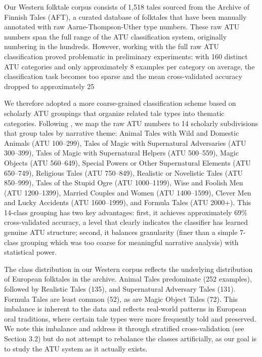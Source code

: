 \documentclass{article}
\begin{document}
Our Western folktale corpus consists of 1,518 tales sourced from the Archive of Finnish Tales (AFT), a curated database of folktales that have been manually annotated with raw Aarne-Thompson-Uther type numbers. These raw ATU numbers span the full range of the ATU classification system, originally numbering in the hundreds. However, working with the full raw ATU classification proved problematic in preliminary experiments: with 160 distinct ATU categories and only approximately 8 examples per category on average, the classification task becomes too sparse and the mean cross-validated accuracy dropped to approximately 25%

We therefore adopted a more coarse-grained classification scheme based on scholarly ATU groupings that organize related tale types into thematic categories. Following \citet{uther2004}, we map the raw ATU numbers to 14 scholarly subdivisions that group tales by narrative theme: Animal Tales with Wild and Domestic Animals (ATU 100--299), Tales of Magic with Supernatural Adversaries (ATU 300--399), Tales of Magic with Supernatural Helpers (ATU 500--559), Magic Objects (ATU 560--649), Special Powers or Other Supernatural Elements (ATU 650--749), Religious Tales (ATU 750--849), Realistic or Novelistic Tales (ATU 850--999), Tales of the Stupid Ogre (ATU 1000--1199), Wise and Foolish Men (ATU 1200--1399), Married Couples and Women (ATU 1400--1599), Clever Men and Lucky Accidents (ATU 1600--1999), and Formula Tales (ATU 2000+). This 14-class grouping has two key advantages: first, it achieves approximately 69\% cross-validated accuracy, a level that clearly indicates the classifier has learned genuine ATU structure; second, it balances granularity (finer than a simple 7-class grouping which was too coarse for meaningful narrative analysis) with statistical power.

The class distribution in our Western corpus reflects the underlying distribution of European folktales in the archive. Animal Tales predominate (252 examples), followed by Realistic Tales (135), and Supernatural Adversary Tales (131). Formula Tales are least common (52), as are Magic Object Tales (72). This imbalance is inherent to the data and reflects real-world patterns in European oral traditions, where certain tale types were more frequently told and preserved. We note this imbalance and address it through stratified cross-validation (see Section 3.2) but do not attempt to rebalance the classes artificially, as our goal is to study the ATU system as it actually exists.
\end{document}
